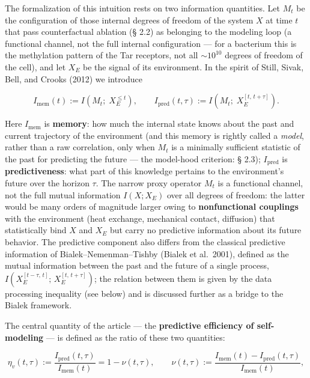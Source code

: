 \documentclass[pdflatex,sn-mathphys-ay]{sn-jnl}
\begin{document}
The formalization of this intuition rests on two information quantities. Let \(M_t\) be the configuration of those internal degrees of freedom of the system \(X\) at time \(t\) that pass counterfactual ablation (§ 2.2) as belonging to the modeling loop (a functional channel, not the full internal configuration --- for a bacterium this is the methylation pattern of the Tar receptors, not all \(\sim 10^{10}\) degrees of freedom of the cell), and let \(X_E\) be the signal of its environment. In the spirit of Still, Sivak, Bell, and Crooks (2012) we introduce

\begin{equation}I_{\text{mem}}(t) := I\!\left(M_t;\; X_E^{\le t}\right), \qquad
  I_{\text{pred}}(t,\tau) := I\!\left(M_t;\; X_E^{[t,\,t+\tau]}\right). \tag{1a}\end{equation}

Here \(I_{\text{mem}}\) is \textbf{memory}: how much the internal state knows about the past and current trajectory of the environment (and this memory is rightly called a \emph{model}, rather than a raw correlation, only when \(M_t\) is a minimally sufficient statistic of the past for predicting the future --- the model-hood criterion: § 2.3); \(I_{\text{pred}}\) is \textbf{predictiveness}: what part of this knowledge pertains to the environment's future over the horizon \(\tau\). The narrow proxy operator \(M_t\) is a functional channel, not the full mutual information \(I(X; X_E)\) over all degrees of freedom: the latter would be many orders of magnitude larger owing to \textbf{nonfunctional couplings} with the environment (heat exchange, mechanical contact, diffusion) that statistically bind \(X\) and \(X_E\) but carry no predictive information about its future behavior. The predictive component also differs from the classical predictive information of Bialek--Nemenman--Tishby (Bialek et al.~2001), defined as the mutual information between the past and the future of a single process, \(I(X_E^{[t-\tau,\,t]};\, X_E^{[t,\,t+\tau]})\); the relation between them is given by the data processing inequality (see below) and is discussed further as a bridge to the Bialek framework.

The central quantity of the article --- the \textbf{predictive efficiency of self-modeling} --- is defined as the ratio of these two quantities:

\begin{equation}\eta_v(t,\tau) := \frac{I_{\text{pred}}(t,\tau)}{I_{\text{mem}}(t)} = 1 - \nu(t,\tau), \qquad
  \nu(t,\tau) := \frac{I_{\text{mem}}(t) - I_{\text{pred}}(t,\tau)}{I_{\text{mem}}(t)}, \tag{1}\end{equation}
\end{document}
